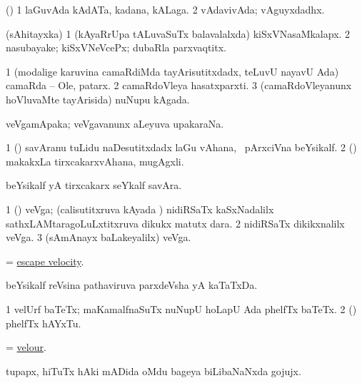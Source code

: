 \bentry
{} 
\gl{\nA}
\expl{}
\bmng
 (\pArxparx) 
\bnum
\num{1} laGuvAda kAdATa, kadana, kALaga. 
\num{2} vAdavivAda; vAguyxdadhx. 
\enum
\emng
\eentry

\bentry
{} 
\gl{\nA}
\expl{}
\bmng
 (sAhitayxka) 
\bnum
\num{1} (kAyaRrUpa tALuvaSuTx balavalalxda) kiSxVNasaMkalapx. 
\num{2} nasubayake; kiSxVNeVcePx; dubaRla parxvaqtitx. 
\enum
\emng
\eentry

\bentry
{} 
\gl{\nA}
\expl{}
\bmng
\bnum
\num{1} (modalige karuvina camaRdiMda tayArisutitxdadx, teLuvU nayavU Ada) camaRda -- Ole, patarx. 
\num{2} camaRdoVleya hasatxparxti. 
\num{3} (camaRdoVleyanunx hoVluvaMte tayArisida) nuNupu kAgada. 
\enum
\emng
\eentry

\bentry
{} 
\gl{\nA}
\expl{}
\bmng
 veVgamApaka; veVgavanunx aLeyuva upakaraNa. 
\emng
\eentry

\bentry
{} 
\gl{\nA}
\expl{}
\bmng
\bnum
\num{1} (\ca) savAranu tuLidu naDesutitxdadx laGu vAhana, \kanmu\ pArxciVna beYsikalf. 
\num{2} (\ame) makakxLa tirxcakarxvAhana, mugAgxli. 
\enum
\emng
\eentry

\bentry
{} 
\gl{\nA}
\expl{}
\bmng
 beYsikalf yA tirxcakarx seYkalf savAra. 
\emng
\eentry

\bentry
{} 
\gl{\nA}
\bmng
\bnum
\num{1} (\Bwvi) veVga; (calisutitxruva kAyada \vi) nidiRSaTx kaSxNadalilx sathxLAMtaragoLuLxtitxruva dikukx matutx dara. 
\num{2} nidiRSaTx dikikxnalilx veVga. 
\num{3} (sAmAnayx baLakeyalilx) veVga. 
\enum
\emng

\noindent 
\gl{\pagu}
\expl{}
\bmng
  = \hyperref{kandict_e.pdf}{E}{escape velocity}{escape velocity}. 
\emng
\eentry

\bentry 
{}
\gl{\nA}
\bmng
beYsikalf reVsina pathaviruva parxdeVsha yA kaTaTxDa. 
\emng
\eentry

\bentry
{} 
\gl{\nA}
\expl{}
\bmng
\bnum
\num{1} velUrf baTeTx; maKamalfnaSuTx nuNupU hoLapU Ada phelfTx baTeTx. 
\num{2} (\pArxparx) phelfTx hAYxTu. 
\enum
\emng
\eentry

\bentry
{} 
\gl{\nA}
\expl{}
\bmng
 = \hyperlink{velour}{velour}. 
\emng
\eentry

\bentry
{} 
\gl{\nA}
\expl{}
\bmng
 tupapx, hiTuTx hAki mADida oMdu bageya biLibaNaNxda gojujx. 
\emng
\eentry

